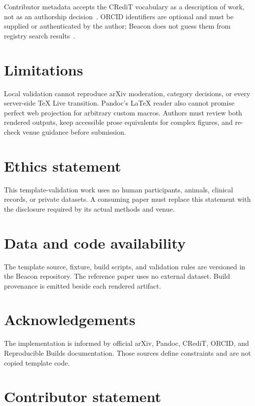 Contributor metadata accepts the CRediT vocabulary as a description of work,
not as an authorship decision~\citep{credit-taxonomy}. ORCID identifiers are
optional and must be supplied or authenticated by the author; Beacon does not
guess them from registry search results~\citep{orcid-search}.

\section{Limitations}

Local validation cannot reproduce arXiv moderation, category decisions, or
every server-side TeX Live transition. Pandoc's LaTeX reader also cannot promise
perfect web projection for arbitrary custom macros. Authors must review both
rendered outputs, keep accessible prose equivalents for complex figures, and
re-check venue guidance before submission.

\section{Ethics statement}

This template-validation work uses no human participants, animals, clinical
records, or private datasets. A consuming paper must replace this statement
with the disclosure required by its actual methods and venue.

\section{Data and code availability}

The template source, fixture, build scripts, and validation rules are versioned
in the Beacon repository. The reference paper uses no external dataset. Build
provenance is emitted beside each rendered artifact.

\section{Acknowledgements}

The implementation is informed by official arXiv, Pandoc, CRediT, ORCID, and
Reproducible Builds documentation. Those sources define constraints and are not
copied template code.

\section{Contributor statement}

\BeaconContributorStatement
